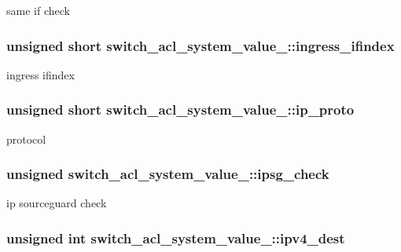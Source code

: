 same if check \hypertarget{unionswitch__acl__system__value___a88e9e80b03fdde4c4d8b2a4712319bf1}{
\subsubsection[{ingress\+\_\+ifindex}]{\setlength{\rightskip}{0pt plus 5cm}unsigned short switch\+\_\+acl\+\_\+system\+\_\+value\+\_\+\+::ingress\+\_\+ifindex}}\label{unionswitch__acl__system__value___a88e9e80b03fdde4c4d8b2a4712319bf1}
ingress ifindex \hypertarget{unionswitch__acl__system__value___a665249b78eda52f2952a01a3f6be3a84}{
\subsubsection[{ip\+\_\+proto}]{\setlength{\rightskip}{0pt plus 5cm}unsigned short switch\+\_\+acl\+\_\+system\+\_\+value\+\_\+\+::ip\+\_\+proto}}\label{unionswitch__acl__system__value___a665249b78eda52f2952a01a3f6be3a84}
protocol \hypertarget{unionswitch__acl__system__value___a6eb445348b1dc9146f06825ad8fa471c}{
\subsubsection[{ipsg\+\_\+check}]{\setlength{\rightskip}{0pt plus 5cm}unsigned switch\+\_\+acl\+\_\+system\+\_\+value\+\_\+\+::ipsg\+\_\+check}}\label{unionswitch__acl__system__value___a6eb445348b1dc9146f06825ad8fa471c}
ip sourceguard check \hypertarget{unionswitch__acl__system__value___af276bc0bb80a2bb10f5e6d55a8f064a8}{
\subsubsection[{ipv4\+\_\+dest}]{\setlength{\rightskip}{0pt plus 5cm}unsigned int switch\+\_\+acl\+\_\+system\+\_\+value\+\_\+\+::ipv4\+\_\+dest}}\label{unionswitch__acl__system__value___af276bc0bb80a2bb10f5e6d55a8f064a8}
